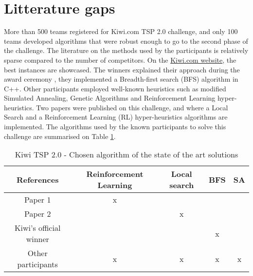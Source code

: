 \section{Litterature gaps}

More than 500 teams registered for Kiwi.com TSP 2.0 challenge, and only 100 teams developed algorithms that were robust enough to go to the second phase of the challenge.
The literature on the methods used by the participants is relatively sparse compared to the number of competitors. On the \href{hhttps://code.kiwi.com/articles/travelling-salesman-challenge-2-0-wrap-up/}{Kiwi.com website}, the best instances are showcased. The winners explained their approach during the award ceremony \cite{tsp2_award}, they implemented a Breadth-first search (BFS) algorithm in C++. Other participants employed well-known heuristics such as modified Simulated Annealing, Genetic Algorithms and Reinforcement Learning hyper-heuristics.
Two papers were published on this challenge, \cite{reinforcement_learning_yaro} and \cite{local_search_yaro} where a Local Search and a Reinforcement Learning (RL) hyper-heuristics algorithms are implemented.
The algorithms used by the known participants to solve this challenge are summarised on Table \ref{table:Kiwi TSP 2.0 - State of the chosen algorithm}.
\begin{table}[!ht]
    \centering
    \caption{Kiwi TSP 2.0 - Chosen algorithm of the state of the art solutions}
    \begin{tabular}{||c c c c c||}
        \toprule
        References                                 & Reinforcement Learning & Local search & BFS & SA \\[1ex]
        \midrule
        Paper 1 \cite{reinforcement_learning_yaro} & x                      &              &     &    \\
        Paper 2 \cite{local_search_yaro}           &                        & x            &     &    \\
        Kiwi's official winner                     &                        &              & x   &    \\
        Other participants                         & x                      & x            & x   & x  \\
        \bottomrule
    \end{tabular}
    \label{table:Kiwi TSP 2.0 - State of the chosen algorithm}
\end{table}

